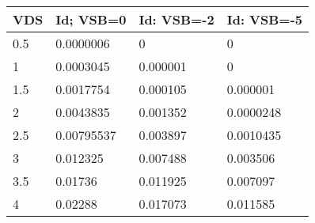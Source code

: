  \begin{tabular}[H]{| l | l | l | l |}
\hline

VDS & Id; VSB=0 & Id: VSB=-2 &  Id: VSB=-5 \\ \hline 
0.5 & 0.0000006 & 0 &  0 \\ \hline 
1 & 0.0003045 & 0.000001 &  0 \\ \hline 
1.5 & 0.0017754 & 0.000105 &  0.000001 \\ \hline 
2 & 0.0043835 & 0.001352 &  0.0000248 \\ \hline 
2.5 & 0.00795537 & 0.003897 &  0.0010435 \\ \hline 
3 & 0.012325 & 0.007488 &  0.003506 \\ \hline 
3.5 & 0.01736 & 0.011925 &  0.007097 \\ \hline 
4 & 0.02288 & 0.017073 &  0.011585 \\ \hline 
\end{tabular}